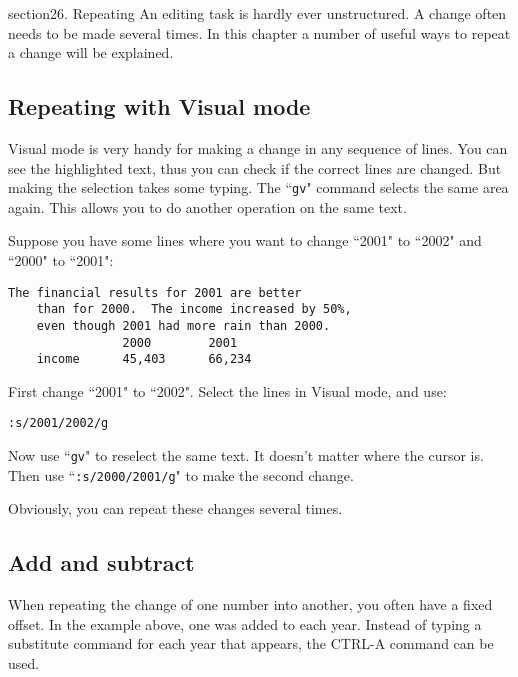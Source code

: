 section{26. Repeating}
An editing task is hardly ever unstructured.
A change often needs to be made several times.
In this chapter a number of useful ways to repeat a change will be explained.
\localtableofcontents
\subsection{Repeating with Visual mode}
Visual mode is very handy for making a change in any sequence of lines.
You can see the highlighted text, thus you can check if the correct lines are changed.
But making the selection takes some typing.
The ``\texttt{gv}" command selects the same area again.
This allows you to do another operation on the same text.

Suppose you have some lines where you want to change ``2001" to ``2002" and ``2000" to ``2001":

\begin{Verbatim}[samepage=true]
    The financial results for 2001 are better 
    than for 2000.  The income increased by 50%, 
    even though 2001 had more rain than 2000. 
                2000        2001 
    income      45,403      66,234 
\end{Verbatim}

First change ``2001" to ``2002".  Select the lines in Visual mode, and use:

\begin{Verbatim}[samepage=true]
 :s/2001/2002/g
\end{Verbatim}

Now use ``\texttt{gv}" to reselect the same text.
It doesn't matter where the cursor is.
Then use ``\texttt{:s/2000/2001/g}" to make the second change.

Obviously, you can repeat these changes several times.
\subsection{Add and subtract}
When repeating the change of one number into another, you often have a fixed offset.
In the example above, one was added to each year.
Instead of typing a substitute command for each year that appears, the CTRL-A command can be used.

